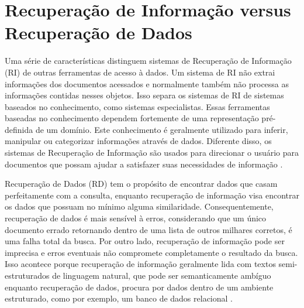 \section{Recuperação de Informação versus Recuperação de Dados}

Uma série de características distinguem sistemas de Recuperação de Informação (\ac{RI}) de outras ferramentas de acesso à dados. Um sistema de \ac{RI} não extrai informações dos documentos acessados e normalmente também não processa as informações contidas nesses objetos. Isso separa os sistemas de RI de sistemas baseados no conhecimento, como sistemas especialistas. Essas ferramentas baseadas no conhecimento dependem fortemente de uma representação pré-definida de um domínio. Este conhecimento é geralmente utilizado para inferir, manipular ou categorizar informações através de dados. Diferente disso, os sistemas de Recuperação de Informação são usados para direcionar o usuário para documentos que possam ajudar a satisfazer suas necessidades de informação \citep{Ruthven2003}.

Recuperação de Dados (\ac{RD}) tem o propósito de encontrar dados que casam perfeitamente com a consulta, enquanto recuperação de informação visa encontrar os dados que possuam no mínimo alguma similaridade. Consequentemente, recuperação de dados é mais sensível à erros, considerando que um único documento errado retornando dentro de uma lista de outros milhares corretos, é uma falha total da busca. Por outro lado, recuperação de informação pode ser imprecisa e erros eventuais não compromete completamente o resultado da busca. Isso acontece porque recuperação de informação geralmente lida com textos semi-estruturados de linguagem natural, que pode ser semanticamente ambíguo enquanto recuperação de dados, procura por dados dentro de um ambiente estruturado, como por exemplo, um banco de dados relacional \cite{Fred2008}.

